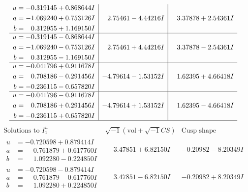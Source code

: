 \documentclass[1p]{elsarticle_modified}
\theoremstyle{definition}
\newcommand{\I}{\sqrt{-1}}
\begin{document}
$$\begin{array}{c|c|c}
\begin{aligned}
u &= -0.319145 + 0.868644 I \\
a &= -1.069240 + 0.753126 I \\
b &= \phantom{-}0.312955 + 1.169150 I\end{aligned}
 & \phantom{-}2.75461 - 4.44216 I & \phantom{-}3.37878 + 2.54361 I \\ \hline\begin{aligned}
u &= -0.319145 - 0.868644 I \\
a &= -1.069240 - 0.753126 I \\
b &= \phantom{-}0.312955 - 1.169150 I\end{aligned}
 & \phantom{-}2.75461 + 4.44216 I & \phantom{-}3.37878 - 2.54361 I \\ \hline\begin{aligned}
u &= -0.041796 + 0.911678 I \\
a &= \phantom{-}0.708186 - 0.291456 I \\
b &= -0.236115 - 0.657820 I\end{aligned}
 & -4.79614 - 1.53152 I & \phantom{-}1.62395 + 4.66418 I \\ \hline\begin{aligned}
u &= -0.041796 - 0.911678 I \\
a &= \phantom{-}0.708186 + 0.291456 I \\
b &= -0.236115 + 0.657820 I\end{aligned}
 & -4.79614 + 1.53152 I & \phantom{-}1.62395 - 4.66418 I\\
 \hline 
 \end{array}$$\newpage$$\begin{array}{c|c|c}  
\text{Solutions to }I^u_{1}& \I (\text{vol} + \sqrt{-1}CS) & \text{Cusp shape}\\
 \hline 
\begin{aligned}
u &= -0.720598 + 0.879414 I \\
a &= \phantom{-}0.761879 + 0.617760 I \\
b &= \phantom{-}1.092280 - 0.224850 I\end{aligned}
 & \phantom{-}3.47851 + 6.82150 I & -0.20982 - 8.20349 I \\ \hline\begin{aligned}
u &= -0.720598 - 0.879414 I \\
a &= \phantom{-}0.761879 - 0.617760 I \\
b &= \phantom{-}1.092280 + 0.224850 I\end{aligned}
 & \phantom{-}3.47851 - 6.82150 I & -0.20982 + 8.20349 I \\ \hline\begin{aligned}

\end{aligned}
\end{array}$$
\end{document}

